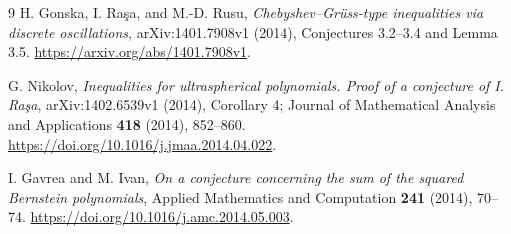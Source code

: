 \documentclass[11pt]{article}
\begin{document}
\begin{thebibliography}{9}
H. Gonska, I. Ra\c{s}a, and M.-D. Rusu,
\emph{Chebyshev--Gr\"uss-type inequalities via discrete oscillations},
arXiv:1401.7908v1 (2014), Conjectures 3.2--3.4 and Lemma 3.5.
\url{https://arxiv.org/abs/1401.7908v1}.

G. Nikolov,
\emph{Inequalities for ultraspherical polynomials. Proof of a conjecture
of I. Ra\c{s}a}, arXiv:1402.6539v1 (2014), Corollary 4;
Journal of Mathematical Analysis and Applications \textbf{418} (2014),
852--860. \url{https://doi.org/10.1016/j.jmaa.2014.04.022}.

I. Gavrea and M. Ivan,
\emph{On a conjecture concerning the sum of the squared Bernstein
polynomials}, Applied Mathematics and Computation \textbf{241} (2014),
70--74. \url{https://doi.org/10.1016/j.amc.2014.05.003}.
\end{thebibliography}
\end{document}
